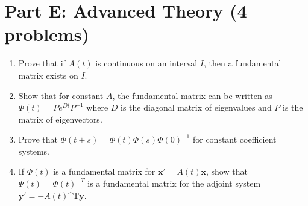 \documentclass[12pt]{article}
\begin{document}

\section*{Part E: Advanced Theory (4 problems)}

\begin{enumerate}[resume]
\item Prove that if $A(t)$ is continuous on an interval $I$, then a fundamental matrix exists on $I$.

\item Show that for constant $A$, the fundamental matrix can be written as $\Phi(t) = P e^{Dt} P^{-1}$ where $D$ is the diagonal matrix of eigenvalues and $P$ is the matrix of eigenvectors.

\item Prove that $\Phi(t+s) = \Phi(t)\Phi(s)\Phi(0)^{-1}$ for constant coefficient systems.

\item If $\Phi(t)$ is a fundamental matrix for $\mathbf{x}' = A(t)\mathbf{x}$, show that $\Psi(t) = \Phi(t)^{-T}$ is a fundamental matrix for the adjoint system $\mathbf{y}' = -A(t)$^{T}$\mathbf{y}$.
\end{enumerate}
\end{document}

